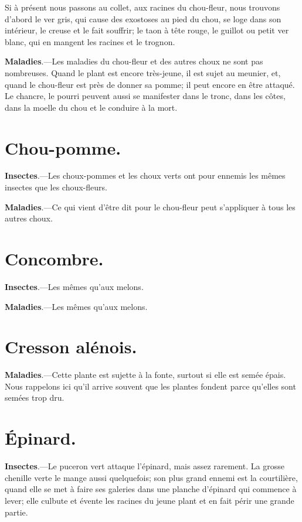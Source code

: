\documentclass[10pt,a4paper]{book}
\begin{document}
Si à présent nous passons au collet, aux racines du chou-fleur, nous trouvons d'abord le ver gris, qui cause des exostoses au pied du chou, se loge dans son intérieur, le creuse et le fait souffrir; le taon à tête rouge, le guillot ou petit ver blanc, qui en mangent les racines et le trognon.

\textbf{Maladies}.---Les maladies du chou-fleur et des autres choux ne sont pas nombreuses. Quand le plant est encore très-jeune, il est sujet au meunier, et, quand le chou-fleur est près de donner sa pomme; il peut encore en être attaqué. Le chancre, le pourri peuvent aussi se manifester dans le tronc, dans les côtes, dans la moelle du chou et le conduire à la mort.

\section{Chou-pomme.}

\textbf{Insectes}.---Les choux-pommes et les choux verts ont pour ennemis les mêmes insectes que les choux-fleurs.

\textbf{Maladies}.---Ce qui vient d'être dit pour le chou-fleur peut s'appliquer à tous les autres choux.

\section{Concombre.}

\textbf{Insectes}.---Les mêmes qu'aux melons.

\textbf{Maladies}.---Les mêmes qu'aux melons.

\section{Cresson alénois.}

\textbf{Maladies}.---Cette plante est sujette à la fonte, surtout si elle est semée épais. Nous rappelons ici qu'il arrive souvent que les plantes fondent parce qu'elles sont semées trop dru.

\section{Épinard.}

\textbf{Insectes}.---Le puceron vert attaque l'épinard, mais assez rarement. La grosse chenille verte le mange aussi quelquefois; son plus grand ennemi est la courtilière, quand elle se met à faire ses galeries dans une planche d'épinard qui commence à lever; elle culbute et évente les racines du jeune plant et en fait périr une grande partie.
\end{document}
